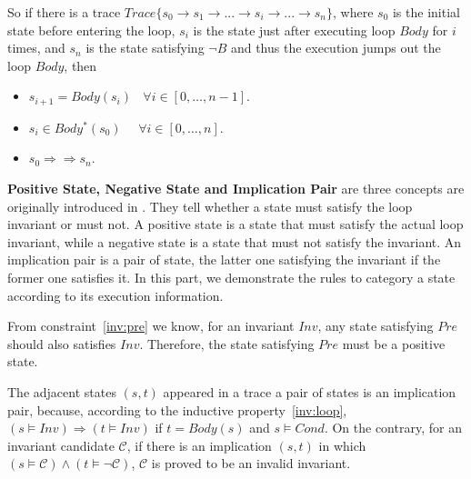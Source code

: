 So if there is a trace $Trace\{s_0 \to s_1 \to ...\to s_i \to ... \to s_n\}$, 
where $s_0$ is the initial state before entering the loop, 
$s_i$ is the state just after executing loop $Body$ for $i$ times,
and $s_n$ is the state satisfying $\neg B$ and thus the execution jumps out the loop $Body$,
then 
\begin{itemize}
\item $s_{i+1} = Body(s_i)~~~~\forall i \in [0, \ldots, n-1]$.
\item $s_{i} \in Body^*(s_0)~~~~~~\forall i \in [0, \ldots, n]$.
\item $s_{0} \Rightarrow\Rightarrow s_{n}$.
\end{itemize}

\medskip\noindent
\textbf{Positive State, Negative State and Implication Pair}
are three concepts are originally introduced in \cite{sharma2014invariant}.
They tell whether a state must satisfy the loop invariant or must not.
A positive state is a state that must satisfy the actual loop invariant,
while a negative state is a state that must not satisfy the invariant.
An implication pair is a pair of state, the latter one satisfying the invariant 
if the former one satisfies it. 
In this part, we demonstrate the rules to category a state according to its execution information.


From constraint~\ref{inv:pre} we know, for an invariant $Inv$, 
any state satisfying $Pre$ should also satisfies $Inv$. 
Therefore, the state satisfying $Pre$ must be a positive state. 

The adjacent states $(s, t)$ appeared in a trace a pair of states is an implication pair,
because, according to the inductive property~\ref{inv:loop},
$(s \models Inv) \Rightarrow (t \models {Inv})$
if $t = Body(s)$ and $s \models Cond$.
On the contrary, for an invariant candidate $\mathcal{C}$, 
if there is an implication $(s, t)$ in which $(s \models \mathcal{C}) \wedge (t \models \neg \mathcal{C})$,
$\mathcal{C}$ is proved to be an invalid invariant.

